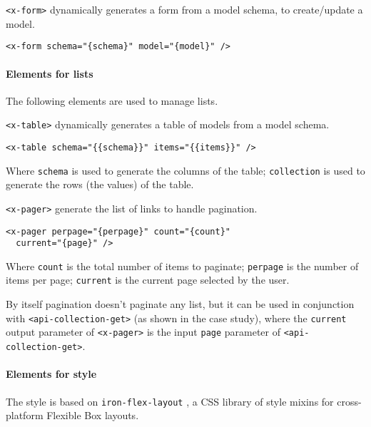 \texttt{<x-form>}  dynamically generates a form from a model schema, to create/update a model.

\begin{lstlisting}[language=HTML5]
<x-form schema="{schema}" model="{model}" />
\end{lstlisting}

\paragraph{Elements for lists}

The following elements are used to manage lists. 

\vspace{0.2cm}

\texttt{<x-table>}  dynamically generates a table of models from a model schema. 

\begin{lstlisting}[language=HTML5]
<x-table schema="{{schema}}" items="{{items}}" />
\end{lstlisting}

Where \texttt{schema} is used to generate the columns of the table; 
\texttt{collection} is used to generate the rows (the values) of the table.

\vspace{0.2cm}

\texttt{<x-pager>} generate the list of links to handle pagination.

\begin{lstlisting}[language=HTML5]
<x-pager perpage="{perpage}" count="{count}" 
  current="{page}" />
\end{lstlisting}

Where \texttt{count} is the total number of items to paginate; 
\texttt{perpage} is the number of items per page; 
\texttt{current} is the current page selected by the user.

By itself pagination doesn't paginate any list, but it can be used in conjunction with \texttt{<api-collection-get>} (as shown in the case study), where the \texttt{current} output parameter of \texttt{<x-pager>} is the input \texttt{page} parameter of \texttt{<api-collection-get>}.

\paragraph{Elements for style}

The style is based on \texttt{iron-flex-layout} \cite{iron-elements}, a CSS library of style mixins for cross-platform Flexible Box layouts.

